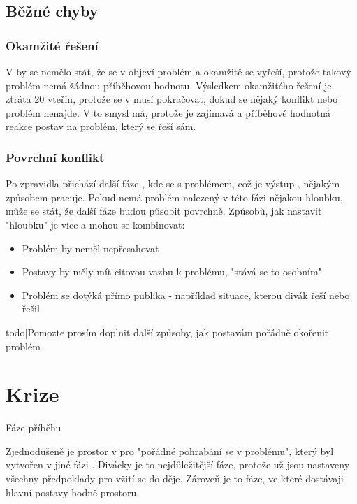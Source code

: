 \subsection{ Běžné chyby }  
\subsubsection{ Okamžité řešení } V  by se nemělo stát, že se v  objeví problém a okamžitě se vyřeší, protože takový problém nemá žádnou příběhovou hodnotu. Výsledkem okamžitého řešení je ztráta 20 vteřin, protože se v  musí pokračovat, dokud se nějaký konflikt nebo problém nenajde. V  to smysl má, protože je zajímavá a příběhově hodnotná reakce postav na problém, který se řeší sám. 
 
\subsubsection{ Povrchní konflikt } Po  zpravidla přichází další fáze , kde se s problémem, což je výstup , nějakým způsobem pracuje. Pokud nemá problém nalezený v této fázi nějakou hloubku, může se stát, že další fáze  budou působit povrchně. Způsobů, jak nastavit "hloubku"{} je více a mohou se kombinovat: 
 
\begin{itemize}
\item  Problém by neměl nepřesahovat  
\item  Postavy by měly mít citovou vazbu k problému, "stává se to osobním"
\item  Problém se dotýká přímo publika - například situace, kterou divák řeší nebo řešil
\end{itemize}
 
{{todo|Pomozte prosím doplnit další způsoby, jak postavám pořádně okořenit problém}} 
 
  
 
 
 
\needspace{5cm} \section{Krize} \label{krize} {{Fáze příběhu}} 
 
Zjednodušeně je  prostor v  pro "pořádné pohrabání se v problému", který byl vytvořen v jiné fázi . Divácky je to nejdůležitější fáze, protože už jsou nastaveny všechny předpoklady pro vžití se do děje. Zároveň je to fáze, ve které dostávaji hlavní postavy hodně prostoru. 
 
